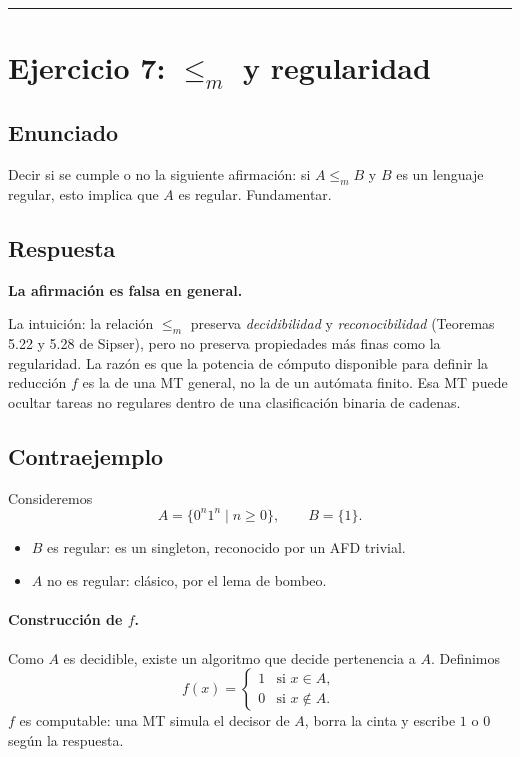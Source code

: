 \documentclass[11pt,a4paper]{article}
\theoremstyle{plain}
\theoremstyle{definition}
\theoremstyle{remark}
\newcommand{\redm}{\le_{m}}
\begin{document}
\bigskip\hrule\bigskip

\section{Ejercicio 7: $\redm$ y regularidad}
\label{sec:ej7}

\subsection*{Enunciado}

Decir si se cumple o no la siguiente afirmaci\'on: si $A\redm B$ y $B$ es
un lenguaje regular, esto implica que $A$ es regular. Fundamentar.

\subsection*{Respuesta}

\textbf{La afirmaci\'on es falsa en general.}

La intuici\'on: la relaci\'on $\redm$ preserva \emph{decidibilidad} y
\emph{reconocibilidad} (Teoremas 5.22 y 5.28 de Sipser), pero no preserva
propiedades m\'as finas como la regularidad. La raz\'on es que la potencia
de c\'omputo disponible para definir la reducci\'on $f$ es la de una MT
general, no la de un aut\'omata finito. Esa MT puede ocultar tareas no
regulares dentro de una clasificaci\'on binaria de cadenas.

\subsection*{Contraejemplo}

Consideremos
\[
  A = \{0^{n}1^{n} \mid n \ge 0\},\qquad B = \{1\}.
\]

\begin{itemize}
  \item $B$ es regular: es un singleton, reconocido por un AFD trivial.
  \item $A$ no es regular: cl\'asico, por el lema de bombeo.
\end{itemize}

\paragraph{Construcci\'on de $f$.}
Como $A$ es decidible, existe un algoritmo que decide pertenencia a $A$.
Definimos
\[
  f(x) = \begin{cases} 1 & \text{si } x\in A,\\ 0 & \text{si } x\notin A.\end{cases}
\]
$f$ es computable: una MT simula el decisor de $A$, borra la cinta y
escribe $1$ o $0$ seg\'un la respuesta.
\end{document}
